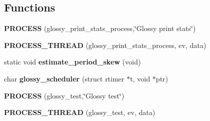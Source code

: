 \subsection*{Functions}
\begin{DoxyCompactItemize}
\item 
\hypertarget{group__glossy-test-print-stats_ga10726d2aa7b149ad5485888bba70177c}{
{\bfseries PROCESS} (glossy\_\-print\_\-stats\_\-process,\char`\"{}Glossy print stats\char`\"{})}
\label{group__glossy-test-print-stats_ga10726d2aa7b149ad5485888bba70177c}

\item 
\hypertarget{group__glossy-test-print-stats_gad8f76fdcda797bef20444c5e4ee181c5}{
{\bfseries PROCESS\_\-THREAD} (glossy\_\-print\_\-stats\_\-process, ev, data)}
\label{group__glossy-test-print-stats_gad8f76fdcda797bef20444c5e4ee181c5}

\item 
\hypertarget{group__glossy-test-skew_ga0bf2ebfd243be5dc3cea2083c55d3f75}{
static void {\bfseries estimate\_\-period\_\-skew} (void)}
\label{group__glossy-test-skew_ga0bf2ebfd243be5dc3cea2083c55d3f75}

\item 
\hypertarget{group__glossy-test-scheduler_gaaf560632558b0a7395e5bc21090c04a4}{
char {\bfseries glossy\_\-scheduler} (struct rtimer $\ast$t, void $\ast$ptr)}
\label{group__glossy-test-scheduler_gaaf560632558b0a7395e5bc21090c04a4}

\item 
\hypertarget{group__glossy-test-init_gaedc8ea09700fab6ffa609345ef21407d}{
{\bfseries PROCESS} (glossy\_\-test,\char`\"{}Glossy test\char`\"{})}
\label{group__glossy-test-init_gaedc8ea09700fab6ffa609345ef21407d}

\item 
\hypertarget{group__glossy-test-init_ga017ea7392ceaa675dbf770b2fbe13097}{
{\bfseries PROCESS\_\-THREAD} (glossy\_\-test, ev, data)}
\label{group__glossy-test-init_ga017ea7392ceaa675dbf770b2fbe13097}

\end{DoxyCompactItemize}
